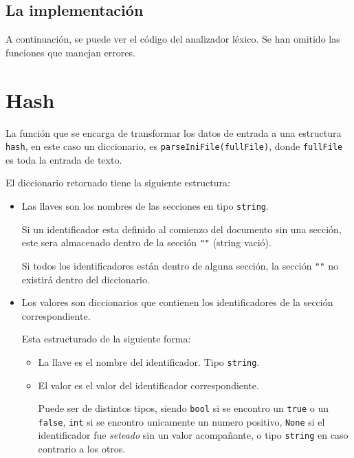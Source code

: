 \documentclass[spanish, fleqn]{article}
\begin{document}
\subsection{La implementación}
A continuación, se puede ver el código del analizador léxico. Se han omitido las funciones que manejan errores.


    

\section{Hash}

La función que se encarga de transformar los datos de entrada a una estructura \texttt{hash}, en este caso un diccionario, es \texttt{parseIniFile(fullFile)}, donde \texttt{fullFile} es toda la entrada de texto.

El diccionario retornado tiene la siguiente estructura:
\begin{itemize}
    \item Las llaves son los nombres de las secciones en tipo \texttt{string}. 
    
    Si un identificador esta definido al comienzo del documento sin una sección, este sera almacenado dentro de la sección \texttt{""} (string vació). 
    
    Si todos los identificadores están dentro de alguna sección, la sección \texttt{""} no existirá dentro del diccionario.
    
    \item Los valores son diccionarios que contienen los identificadores de la sección correspondiente.
    
    Esta estructurado de la siguiente forma:
    \begin{itemize}
        \item La llave es el nombre del identificador. Tipo \texttt{string}.
        
        \item El valor es el valor del identificador correspondiente.
        
        Puede ser de distintos tipos, siendo \texttt{bool} si se encontro un \texttt{true} o un \texttt{false}, \texttt{int} si se encontro unicamente un numero positivo, \texttt{None} si el identificador fue \textit{seteado} sin un valor acompañante, o tipo \texttt{string} en caso contrario a los otros.
    \end{itemize}
\end{itemize}


\end{document}
